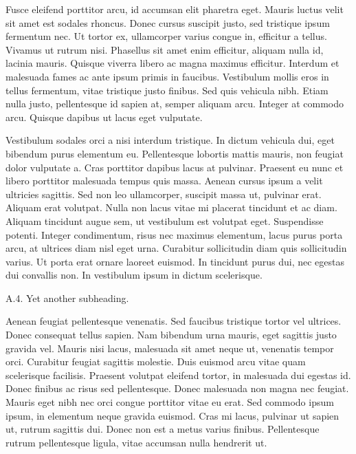 Fusce eleifend porttitor arcu, id accumsan elit pharetra eget. Mauris luctus velit sit amet est sodales rhoncus. Donec cursus suscipit justo, sed tristique ipsum fermentum nec. Ut tortor ex, ullamcorper varius congue in, efficitur a tellus. Vivamus ut rutrum nisi. Phasellus sit amet enim efficitur, aliquam nulla id, lacinia mauris. Quisque viverra libero ac magna maximus efficitur. Interdum et malesuada fames ac ante ipsum primis in faucibus. Vestibulum mollis eros in tellus fermentum, vitae tristique justo finibus. Sed quis vehicula nibh. Etiam nulla justo, pellentesque id sapien at, semper aliquam arcu. Integer at commodo arcu. Quisque dapibus ut lacus eget vulputate.

Vestibulum sodales orci a nisi interdum tristique. In dictum vehicula dui, eget bibendum purus elementum eu. Pellentesque lobortis mattis mauris, non feugiat dolor vulputate a. Cras porttitor dapibus lacus at pulvinar. Praesent eu nunc et libero porttitor malesuada tempus quis massa. Aenean cursus ipsum a velit ultricies sagittis. Sed non leo ullamcorper, suscipit massa ut, pulvinar erat. Aliquam erat volutpat. Nulla non lacus vitae mi placerat tincidunt et ac diam. Aliquam tincidunt augue sem, ut vestibulum est volutpat eget. Suspendisse potenti. Integer condimentum, risus nec maximus elementum, lacus purus porta arcu, at ultrices diam nisl eget urna. Curabitur sollicitudin diam quis sollicitudin varius. Ut porta erat ornare laoreet euismod. In tincidunt purus dui, nec egestas dui convallis non. In vestibulum ipsum in dictum scelerisque.

\begin{description}
	\item[A.4. Yet another subheading.]{}
\end{description}

Aenean feugiat pellentesque venenatis. Sed faucibus tristique tortor vel ultrices. Donec consequat tellus sapien. Nam bibendum urna mauris, eget sagittis justo gravida vel. Mauris nisi lacus, malesuada sit amet neque ut, venenatis tempor orci. Curabitur feugiat sagittis molestie. Duis euismod arcu vitae quam scelerisque facilisis. Praesent volutpat eleifend tortor, in malesuada dui egestas id. Donec finibus ac risus sed pellentesque. Donec malesuada non magna nec feugiat. Mauris eget nibh nec orci congue porttitor vitae eu erat. Sed commodo ipsum ipsum, in elementum neque gravida euismod. Cras mi lacus, pulvinar ut sapien ut, rutrum sagittis dui. Donec non est a metus varius finibus. Pellentesque rutrum pellentesque ligula, vitae accumsan nulla hendrerit ut.

